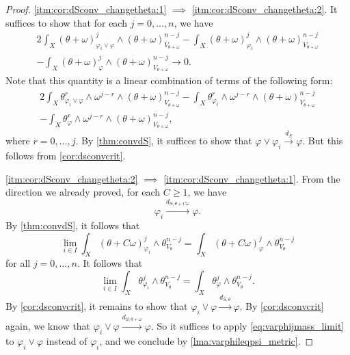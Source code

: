 \begin{proof}
    \ref{itm:cor:dSconv_changetheta:1} $\implies$ \ref{itm:cor:dSconv_changetheta:2}. It suffices to show that for each $j=0,\ldots,n$, we have
    \[
    \begin{split}
        2\int_X (\theta+\omega)_{\varphi_i\lor \varphi}^j\wedge (\theta+\omega)_{V_{\theta+\omega}}^{n-j}-\int_X (\theta+\omega)_{\varphi_i}^j\wedge (\theta+\omega)_{V_{\theta+\omega}}^{n-j}\\
        -\int_X (\theta+\omega)_{\varphi}^j\wedge (\theta+\omega)_{V_{\theta+\omega}}^{n-j}\to 0.
    \end{split}
    \]
    Note that this quantity is a linear combination of terms of the following form:
    \[
    \begin{split}
        2\int_X \theta_{\varphi_i\lor \varphi}^r\wedge \omega^{j-r}\wedge (\theta+\omega)_{V_{\theta+\omega}}^{n-j}-\int_X \theta_{\varphi_i}^r\wedge \omega^{j-r}\wedge (\theta+\omega)_{V_{\theta+\omega}}^{n-j}\\
        -\int_X \theta_{\varphi}^r\wedge \omega^{j-r}\wedge (\theta+\omega)_{V_{\theta+\omega}}^{n-j},
    \end{split}
    \]
    where $r=0,\ldots,j$. By \cref{thm:convdS}, it suffices to show that $\varphi \lor \varphi_i \xrightarrow{d_S}\varphi$. But this follows from \cref{cor:dsconvcrit}.

    \ref{itm:cor:dSconv_changetheta:2} $\implies$ \ref{itm:cor:dSconv_changetheta:1}. From the direction we already proved, for each $C\geq 1$, we have
    \[
        \varphi_i\xrightarrow{d_{S,\theta+C\omega}}\varphi.
    \]
    By \cref{thm:convdS}, it follows that
    \[
        \lim_{i\in I}\int_X (\theta+C\omega)_{\varphi_i}^j\wedge \theta_{V_{\theta}}^{n-j}=\int_X (\theta+C\omega)_{\varphi}^j\wedge \theta_{V_{\theta}}^{n-j}
    \]
    for all $j=0,\ldots,n$.
    It follows that
    \begin{equation}\label{eq:varphijmass_limit}
        \lim_{i\in I}\int_X \theta_{\varphi_i}^j\wedge \theta_{V_{\theta}}^{n-j}=\int_X \theta_{\varphi}^j\wedge \theta_{V_{\theta}}^{n-j}.
    \end{equation}
    By \cref{cor:dsconvcrit}, it remains to show that $\varphi_i\lor \varphi\xrightarrow{d_{S,\theta}}\varphi$. By \cref{cor:dsconvcrit} again, we know that $\varphi_i\lor \varphi\xrightarrow{d_{S,\theta+\omega}}\varphi$. So it suffices to apply \eqref{eq:varphijmass_limit} to $\varphi_i\lor \varphi$ instead of $\varphi_i$, and we conclude by \cref{lma:varphileqpsi_metric}.
\end{proof}


